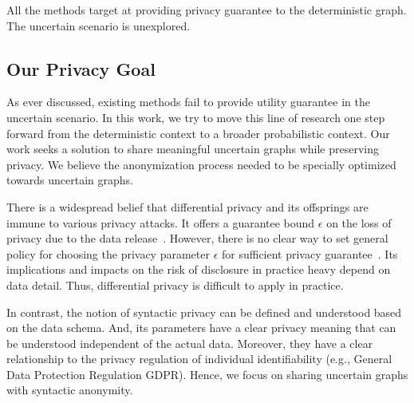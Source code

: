 All the methods target at providing privacy guarantee to the deterministic graph. 
The uncertain scenario is unexplored. 

\subsection{Our Privacy Goal}
As ever discussed, existing methods fail to provide utility guarantee in the uncertain scenario. 
In this work, we try to move this line of research one step forward from the deterministic context to a broader probabilistic context. 
Our work seeks a solution to share meaningful uncertain graphs while preserving privacy.
We believe the anonymization process needed to be specially optimized towards uncertain graphs.

There is a widespread belief that differential privacy and its offsprings are immune to various privacy attacks. It offers a guarantee bound $\epsilon$ on the loss of privacy due to the data release~\cite{Sala_Sharing_2011,Xiao_Differentially_2014}. However, there is no clear way to set general policy for choosing the privacy parameter $\epsilon$ for sufficient privacy guarantee~\cite{lee2011}. Its implications and impacts on the risk of disclosure in practice heavy depend on data detail. Thus, differential privacy is difficult to apply in practice. 

In contrast, the notion of syntactic privacy can be defined and understood based on the data schema. And, its parameters have a clear privacy meaning that can be understood independent of the actual data. Moreover, they have a clear relationship to the privacy regulation of individual identifiability (e.g., General Data Protection Regulation GDPR). 
Hence, we focus on sharing uncertain graphs with syntactic anonymity. 